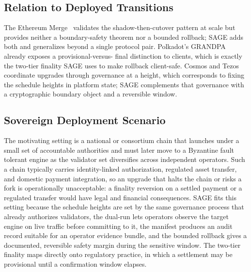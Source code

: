 \documentclass[journal]{IEEEtran}
\begin{document}
\subsection{Relation to Deployed Transitions}
The Ethereum Merge~\cite{gasper} validates the shadow-then-cutover pattern at scale but provides
neither a boundary-safety theorem nor a bounded rollback; SAGE adds both and generalizes beyond
a single protocol pair. Polkadot's GRANDPA~\cite{grandpa} already exposes a provisional-versus-
final distinction to clients, which is exactly the two-tier finality SAGE uses to make rollback
client-safe. Cosmos and Tezos~\cite{tenderbake} coordinate upgrades through governance at a
height, which corresponds to fixing the schedule heights in platform state; SAGE complements
that governance with a cryptographic boundary object and a reversible window.

\subsection{Sovereign Deployment Scenario}
The motivating setting is a national or consortium chain that launches under a small set of
accountable authorities and must later move to a Byzantine fault tolerant engine as the
validator set diversifies across independent operators. Such a chain typically carries
identity-linked authorization, regulated asset transfer, and domestic payment integration, so an
upgrade that halts the chain or risks a fork is operationally unacceptable: a finality reversion
on a settled payment or a regulated transfer would have legal and financial consequences. SAGE
fits this setting because the schedule heights are set by the same governance process that
already authorizes validators, the dual-run lets operators observe the target engine on live
traffic before committing to it, the manifest produces an audit record suitable for an operator
evidence bundle, and the bounded rollback gives a documented, reversible safety margin during the
sensitive window. The two-tier finality maps directly onto regulatory practice, in which a
settlement may be provisional until a confirmation window elapses.
\end{document}
